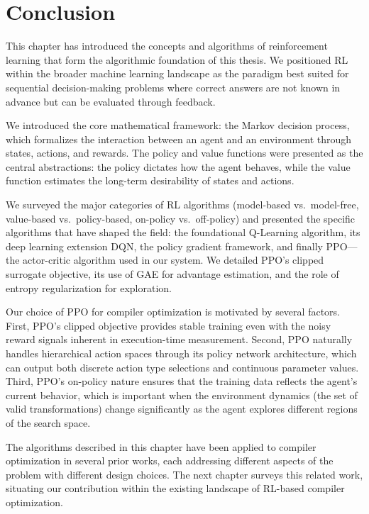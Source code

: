 \section{Conclusion}

This chapter has introduced the concepts and algorithms of reinforcement learning that form the algorithmic foundation of this thesis. We positioned RL within the broader machine learning landscape as the paradigm best suited for sequential decision-making problems where correct answers are not known in advance but can be evaluated through feedback.

We introduced the core mathematical framework: the Markov decision process, which formalizes the interaction between an agent and an environment through states, actions, and rewards. The policy and value functions were presented as the central abstractions: the policy dictates how the agent behaves, while the value function estimates the long-term desirability of states and actions.

We surveyed the major categories of RL algorithms (model-based vs.\ model-free, value-based vs.\ policy-based, on-policy vs.\ off-policy) and presented the specific algorithms that have shaped the field: the foundational Q-Learning algorithm, its deep learning extension DQN, the policy gradient framework, and finally PPO—the actor-critic algorithm used in our system. We detailed PPO's clipped surrogate objective, its use of GAE for advantage estimation, and the role of entropy regularization for exploration.

Our choice of PPO for compiler optimization is motivated by several factors. First, PPO's clipped objective provides stable training even with the noisy reward signals inherent in execution-time measurement. Second, PPO naturally handles hierarchical action spaces through its policy network architecture, which can output both discrete action type selections and continuous parameter values. Third, PPO's on-policy nature ensures that the training data reflects the agent's current behavior, which is important when the environment dynamics (the set of valid transformations) change significantly as the agent explores different regions of the search space.

The algorithms described in this chapter have been applied to compiler optimization in several prior works, each addressing different aspects of the problem with different design choices. The next chapter surveys this related work, situating our contribution within the existing landscape of RL-based compiler optimization.
